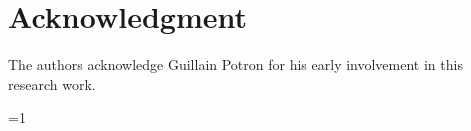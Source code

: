 \documentclass[twoside,envcountsame,runningheads]{llncs}
\def\fullversion{0} %
\begin{document}
\section{Acknowledgment}

The authors acknowledge Guillain Potron for his early involvement in this research work.



\nocite{rsync}
\nocite{wagner}



\appendix


\ifnum\fullversion=1
\end{document}
